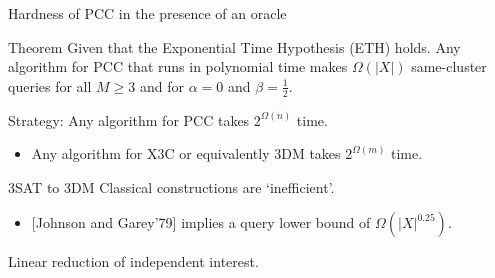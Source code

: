\documentclass{beamer}
\begin{document}
\begin{frame}{Hardness of PCC in the presence of an oracle}
	\begin{block}{Theorem}
		Given that the Exponential Time Hypothesis (ETH) holds. Any algorithm for PCC that runs in polynomial time makes $\Omega(|X|)$ same-cluster queries for all $M \ge 3$ and for $\alpha = 0$ and $\beta = \frac{1}{2}$. 
	\end{block}
	\vspace{20pt}Strategy: Any algorithm for PCC takes $2^{\Omega(n)}$ time.
	\begin{itemize}
		\vspace{10pt}\item Any algorithm for X3C or equivalently 3DM takes $2^{\Omega(m)}$ time.
	\end{itemize}
\end{frame}

\begin{frame}{3SAT to 3DM}
	Classical constructions are `inefficient'.\\
	\begin{itemize}
	\vspace{10pt}\item \alert{[Johnson and Garey'79]} implies a query lower bound of $\Omega(|X|^{0.25})$.
	\end{itemize}
	
	\vspace{30pt}Linear reduction of independent interest.	
\end{frame}
\end{document}
